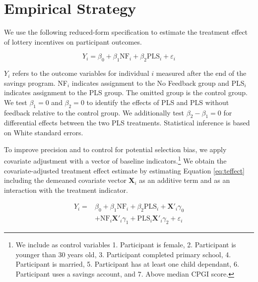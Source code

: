 \documentclass[11pt]{article}
\begin{document}
		\clearpage

\section{Empirical Strategy} \label{sec:est}


		We use the following reduced-form specification to estimate the treatment effect of lottery incentives on participant outcomes.

		\begin{equation} \label{eq:teffect}
			Y_{i} = \beta_{0} + \beta_{1}\text{NF}_{i} + \beta_{2}\text{PLS}_{i} + \varepsilon_{i}
		\end{equation}

		$Y_{i}$ refers to the outcome variables for individual $i$ measured after the end of the savings program. NF$_i$ indicates assignment to the No Feedback group and PLS$_i$ indicates assignment to the PLS group. The omitted group is the control group. We test $\beta_{1} = 0$ and $\beta_{2} = 0$ to identify the effects of PLS and PLS without feedback relative to the control group. We additionally test $\beta_{2} - \beta_{1} = 0$ for differential effects between the two PLS treatments. Statistical inference is based on White standard errors.

		To improve precision and to control for potential selection bias, we apply covariate adjustment with a vector of baseline indicators.\footnote{We include as control variables 1. Participant is female, 2. Participant is younger than 30 years old, 3. Participant completed primary school, 4. Participant is married, 5. Participant has at least one child dependant, 6. Participant uses a savings account, and 7. Above median CPGI score.} We obtain the covariate-adjusted treatment effect estimate by estimating Equation \ref{eq:teffect} including the demeaned covariate vector $\mathbf{X}_{i}$ as an additive term and as an interaction with the treatment indicator.

		\begin{equation} \begin{split} \label{eq:controls}
			Y_{i} = & \beta_{0} + \beta_{1}\text{NF}_{i} + \beta_{2}\text{PLS}_{i} + \mathbf{X}'_i \gamma_{0} \\
					& + \text{NF}_{i} \mathbf{X}'_i \gamma_{1} + \text{PLS}_{i} \mathbf{X}'_i \gamma_{2} + \varepsilon_{i}
		\end{split} \end{equation}
\end{document}
